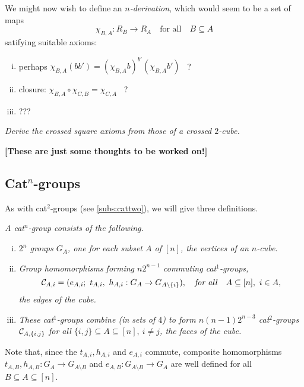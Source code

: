\bigskip
We might now wish to define an \emph{$n$-derivation}, 
which would seem to be a set of maps
$$
\chi_{B,A} : R_B \to R_A  \quad\mbox{for all}\quad  B \subseteq A
$$
satifying suitable axioms:
\begin{enumerate}[(i)]
\item
perhaps  \qquad 
$\chi_{B,A}(bb') = (\chi_{B,A} b)^{b'} (\chi_{B,A} b')$ ~?
\item
closure: \qquad
$\chi_{B,A} \circ \chi_{C,B} = \chi_{C,A}$ ~?
\item ???
\end{enumerate}

\begin{exercise}
\emph{Derive the crossed square axioms 
from those of a crossed $2$-cube.}
\end{exercise}


\bigskip\noindent
{\bf [These are just some thoughts to be worked on!]}



\subsection{Cat$^n$-groups}   

As with cat$^2$-groups (see \ref{subs:cattwo}), 
we will give three definitions. 

\begin{defn} \label{def:catna}
\emph{A cat$^n$-group consists of the following.} 
\begin{enumerate}[(i)]
\item
\emph{$2^n$ groups  $G_A$, one for each subset  $A$  of  $[n]$, 
the \emph{vertices} of an $n$-cube.} 
\item
\emph{Group homomorphisms forming $n2^{n-1}$ commuting cat$^1$-groups,} 
$$
\mathcal{C}_{A,i} = (e_{A,i};\ t_{A,i},\ h_{A,i} : G_A \to G_{A \setminus \{i\}}), 
\quad\mbox{\emph{for all}} \quad A \subseteq [n],~ i \in A,  
$$
\emph{the \emph{edges} of the cube.} 
\item 
\emph{These cat$^1$-groups combine (in sets of $4$) 
to form $n(n-1)2^{n-3}$ cat$^2$-groups $\mathcal{C}_{A,\{i,j\}}$ 
for all $\{i,j\} \subseteq A \subseteq [n],~ i \neq j$, 
the \emph{faces} of the cube.} 
\end{enumerate}
\end{defn}
Note that, since the $t_{A,i}, h_{A,i}$ and $e_{A,i}$ commute, 
composite homomorphisms
$t_{A,B}, h_{A,B} : G_A \to G_{A \setminus B}$ and 
$e_{A,B} : G_{A \setminus B} \to G_A$ 
are well defined for all $B \subseteq A \subseteq [n]$.  

